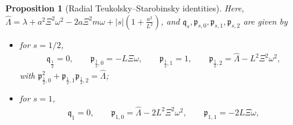 \documentclass[11pt]{article}
\newtheorem{proposition}{Proposition}[section]
\numberwithin{equation}{section}
\begin{document}
\begin{proposition}[Radial Teukolsky--Starobinsky identities]
Here, $\hat \Lambda=\lambda+a^2\Xi^2\omega^2-2a\Xi^2m\omega+|s|\left(1+\frac{a^2}{L^2}\right)$, and  $\mathfrak q_{s},\mathfrak p_{s,0},\mathfrak p_{s,1},\mathfrak p_{s,2}$ are given by
\begin{itemize}
\item for $s=1/2$,
\begin{align*}
\mathfrak q_{\frac12}=0, \qquad\mathfrak{p}_{\frac12,0}= -L\Xi\omega,\qquad 
\mathfrak{p}_{\frac12,1}= 1,\qquad
\mathfrak{p}_{\frac12,2}= \hat\Lambda-L^2\Xi^2\omega^2,
\end{align*}
with $\mathfrak{p}_{\frac12,0}^2+\mathfrak{p}_{\frac12,1}\mathfrak{p}_{\frac12,2}=\hat \Lambda$;
\item for $s=1$,
\begin{gather*}
\mathfrak q_{1}=0, \qquad\mathfrak{p}_{1,0}= \hat\Lambda-2L^2\Xi^2\omega^2,\qquad
\mathfrak{p}_{1,1}= -2L\Xi\omega,\\

\end{gather*}
\end{itemize}
\end{proposition}
\end{document}
